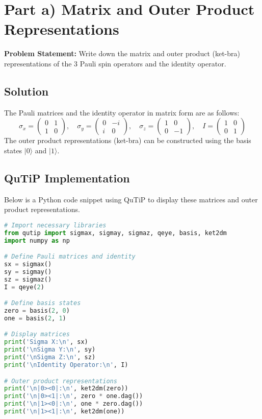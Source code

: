 \documentclass[12pt]{article}
\begin{document}
\newpage

\section{Part a) Matrix and Outer Product Representations}

\textbf{Problem Statement:} Write down the matrix and outer product (ket-bra) representations of the 3 Pauli spin operators and the identity operator.

\subsection{Solution}

The Pauli matrices and the identity operator in matrix form are as follows:
\[
\sigma_x = \begin{pmatrix} 0 & 1 \\ 1 & 0 \end{pmatrix}, \quad \sigma_y = \begin{pmatrix} 0 & -i \\ i & 0 \end{pmatrix}, \quad \sigma_z = \begin{pmatrix} 1 & 0 \\ 0 & -1 \end{pmatrix}, \quad I = \begin{pmatrix} 1 & 0 \\ 0 & 1 \end{pmatrix}
\]
The outer product representations (ket-bra) can be constructed using the basis states \( |0\rangle \) and \( |1\rangle \).

\subsection{QuTiP Implementation}

Below is a Python code snippet using QuTiP to display these matrices and outer product representations.

\begin{lstlisting}[language=Python, caption=Matrix and Outer Product Representations in QuTiP]
# Import necessary libraries
from qutip import sigmax, sigmay, sigmaz, qeye, basis, ket2dm
import numpy as np

# Define Pauli matrices and identity
sx = sigmax()
sy = sigmay()
sz = sigmaz()
I = qeye(2)

# Define basis states
zero = basis(2, 0)
one = basis(2, 1)

# Display matrices
print('Sigma X:\n', sx)
print('\nSigma Y:\n', sy)
print('\nSigma Z:\n', sz)
print('\nIdentity Operator:\n', I)

# Outer product representations
print('\n|0><0|:\n', ket2dm(zero))
print('\n|0><1|:\n', zero * one.dag())
print('\n|1><0|:\n', one * zero.dag())
print('\n|1><1|:\n', ket2dm(one))
\end{lstlisting}
\end{document}
